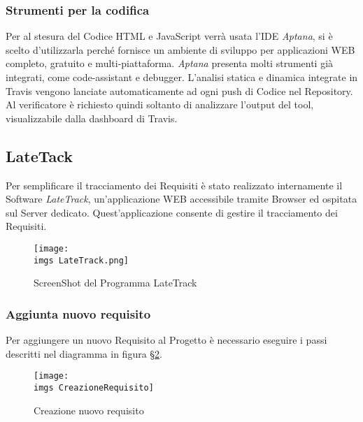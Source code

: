   \subsubsection{Strumenti per la codifica}
  \label{sec:strumentiCodifica}
  Per al stesura del Codice HTML e JavaScript verrà usata l'IDE \emph{Aptana}, si è scelto d'utilizzarla perché fornisce un ambiente di sviluppo per applicazioni WEB completo, gratuito e multi-piattaforma.
  \emph{Aptana} presenta molti strumenti già integrati, come code-assistant e debugger. 
  L’analisi statica e dinamica integrate in Travis vengono lanciate automaticamente ad ogni push di Codice nel Repository. Al verificatore è richiesto quindi soltanto di analizzare l’output del tool, visualizzabile dalla dashboard di Travis.
  
  
  \subsection{LateTack}
  \label{sec:lateTrack}
  Per semplificare il tracciamento dei Requisiti è stato realizzato internamente il Software
  \emph{LateTrack}, un’applicazione WEB accessibile tramite Browser ed ospitata sul Server dedicato.
  Quest’applicazione consente di gestire il tracciamento dei Requisiti.
  
  \begin{figure}[H]
  	\centering
  \texttt{[image: \\imgs LateTrack.png]}
    \caption{ScreenShot del Programma LateTrack}
    \label{fig:lateTrack}
  \end{figure}
  \subsubsection{Aggiunta nuovo requisito}
  Per aggiungere un nuovo Requisito al Progetto è necessario eseguire i passi descritti nel
  diagramma in figura \S\ref{fig:CreazioneRequisito}.
  \begin{figure}
  	\centering
  	\texttt{[image: \\imgs CreazioneRequisito]}
   	 \caption{Creazione nuovo requisito}
    	\label{fig:CreazioneRequisito}
  \end{figure}
  
  